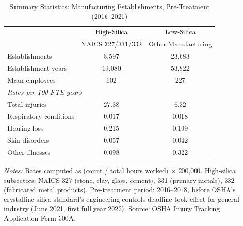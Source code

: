 \begin{table}[t]
\centering
\caption{Summary Statistics: Manufacturing Establishments, Pre-Treatment (2016--2021)}
\label{tab:summary}
\begin{tabular}{lcc}
\toprule
 & High-Silica & Low-Silica \\
 & NAICS 327/331/332 & Other Manufacturing \\
\midrule
Establishments & 8,597 & 23,683 \\
Establishment-years & 19,080 & 53,822 \\
Mean employees & 102 & 227 \\
\midrule
\multicolumn{3}{l}{\textit{Rates per 100 FTE-years}} \\[3pt]
Total injuries & 27.38 & 6.32 \\
Respiratory conditions & 0.017 & 0.018 \\
Hearing loss & 0.215 & 0.109 \\
Skin disorders & 0.057 & 0.042 \\
Other illnesses & 0.098 & 0.322 \\
\bottomrule
\end{tabular}
\begin{tablenotes}
\small
\item \textit{Notes:} Rates computed as (count / total hours worked) $\times$ 200,000.
High-silica subsectors: NAICS 327 (stone, clay, glass, cement), 331 (primary metals),
332 (fabricated metal products). Pre-treatment period: 2016--2018, before OSHA's
crystalline silica standard's engineering controls deadline took effect for general industry (June 2021, first full year 2022).
Source: OSHA Injury Tracking Application Form 300A.
\end{tablenotes}
\end{table}
